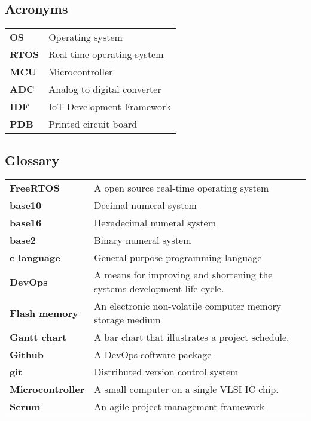 \documentclass[../report.tex]{subfiles}
\begin{document}
\subsection{Acronyms}
\begin{table}[H]
    \begin{center}
        \begin{tabularx}{\linewidth}{l L}
            \textbf{OS} & Operating system\\
            \textbf{RTOS} & Real-time operating system\\
            \textbf{MCU} & Microcontroller\\
            \textbf{ADC} & Analog to digital converter\\
            \textbf{IDF} & IoT Development Framework\\
            \textbf{PDB} & Printed circuit board
        \end{tabularx}
    \end{center}
\end{table}
\subsection{Glossary}
\begin{table}[H]
    \begin{center}
        \begin{tabularx}{\linewidth}{l L}
            \textbf{FreeRTOS} & A open source real-time operating system \\
            \textbf{base10} & Decimal numeral system \\
            \textbf{base16} & Hexadecimal numeral system \\
            \textbf{base2} & Binary numeral system \\
            \textbf{c language} & General purpose programming language \\
            \textbf{DevOps} & A means for improving and shortening the systems development life cycle. \\
            \textbf{Flash memory} & An electronic non-volatile computer memory storage medium \\
            \textbf{Gantt chart} & A bar chart that illustrates a project schedule. \\
            \textbf{Github} & A DevOps software package \\
            \textbf{git} & Distributed version control system \\
            \textbf{Microcontroller} & A small computer on a single VLSI IC chip. \\
            \textbf{Scrum} & An agile project management framework \\
        \end{tabularx}
    \end{center}
\end{table}
\end{document}
